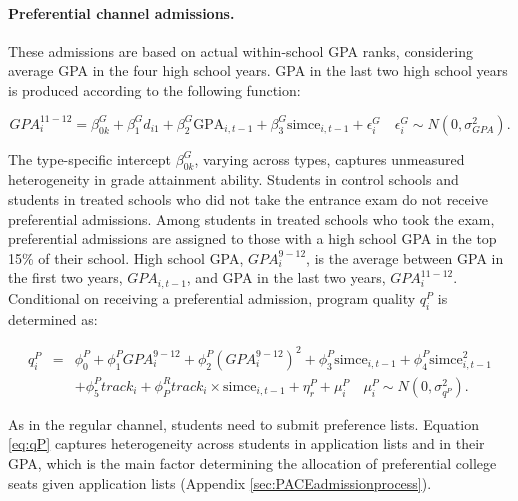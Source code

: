 \paragraph{Preferential channel admissions.} These admissions are based on actual within-school GPA ranks, considering average GPA in the four high school years. GPA in the last two high school years is produced according to the following function:


\begin{equation}\label{eq:GPA} GPA^{11-12}_i=\beta^{G}_{0k}+\beta^{G}_{1}d_{i1}+\beta^{G}_{2}\mbox{GPA}_{i,t-1}+\beta^{G}_{3} \mbox{simce}_{i,t-1}+\epsilon_{i}^{G} \quad \epsilon_{i}^{G} \sim N(0,\sigma^2_{GPA}).
\end{equation} 

\noindent  The type-specific intercept $\beta^{G}_{0k}$, varying across types, captures unmeasured heterogeneity in grade attainment ability. Students in control schools and students in treated schools who did not take the entrance exam do not receive preferential admissions. Among students in treated schools who took the exam, preferential admissions are assigned to those with a high school GPA in the top 15\% of their school. High school GPA, $GPA^{9-12}_i$, is the average between GPA in the first two years, $GPA_{i,t-1}$, and GPA in the last two years, $GPA^{11-12}_i$. Conditional on receiving a preferential admission, program quality $q_i^P$ is determined as:

\begin{eqnarray}\label{eq:qP}
    q_i^P&=&\phi^P_0 + \phi^P_1 GPA^{9-12}_i + \phi^P_2 (GPA^{9-12}_i)^2 + \phi^P_3 \mbox{simce}_{i,t-1}+\phi^P_4 \mbox{simce}_{i,t-1}^2  \\ \nonumber 
    && +\phi^P_5 track_i + \phi^R_P track_i  \times \mbox{simce}_{i,t-1} + \eta^P_r+\mu^P_i \quad \mu_i^P\sim N(0,\sigma^2_{q^P}).
\end{eqnarray}

\noindent As in the regular channel, students need to submit preference lists. Equation \eqref{eq:qP} captures heterogeneity across students in application lists and in their GPA, which is the main factor determining the allocation of preferential college seats given application lists (Appendix \ref{sec:PACEadmissionprocess}).



